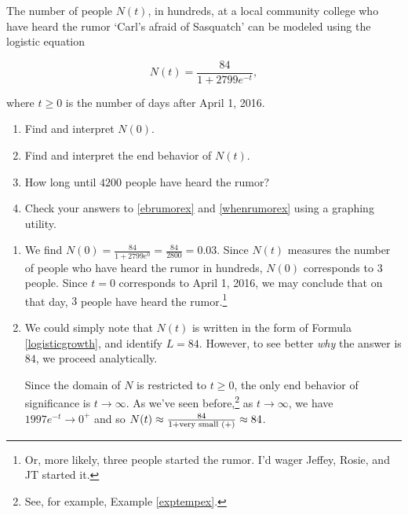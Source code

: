 \documentclass{ximera}
\begin{document}
\begin{example} \label{rumorex} The number of people $N(t)$, in hundreds, at a local community college who have heard the rumor `Carl's afraid of Sasquatch' can be modeled using the logistic equation

\[N(t) = \frac{84}{1+2799e^{-t}},\]

where $t\geq 0$ is the number of days after April 1, 2016.


\begin{enumerate}

\item  Find and interpret $N(0)$.

\item  \label{ebrumorex} Find and interpret the end behavior of $N(t)$. 

\item  \label{whenrumorex} How long until $4200$ people have heard the rumor?

\item  Check your answers to \ref{ebrumorex} and \ref{whenrumorex} using a graphing utility.

\end{enumerate}

\begin{explanation}

\begin{enumerate}

\item  We find $N(0) = \frac{84}{1+2799e^{0}} = \frac{84}{2800} = 0.03$.  Since $N(t)$ measures the number of people who have heard the rumor in hundreds, $N(0)$ corresponds to $3$ people.  Since $t=0$ corresponds to April 1, 2016, we may conclude that on that day, $3$ people have heard the rumor.\footnote{Or, more likely, three people started the rumor.  I'd wager Jeffey, Rosie, and JT started it.} 

\item  We could simply note that $N(t)$ is written in the form of Formula \ref{logisticgrowth}, and identify $L = 84$.  However, to see better \textit{why} the answer is $84$, we proceed analytically.  

Since the domain of $N$ is restricted to $t \geq 0$, the only end behavior of significance is $t \rightarrow \infty$. As we've seen before,\footnote{See, for example, Example \ref{exptempex}.} as $t \rightarrow \infty$, we have $1997 e^{-t} \rightarrow 0^{+}$ and so $N(t) \approx \frac{84}{1 + \text{\scriptsize very small $(+)$}} \approx 84$.  


\end{enumerate}
\end{explanation}
\end{example}
\end{document}
